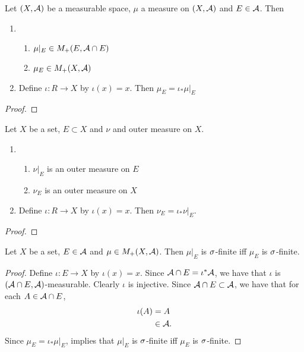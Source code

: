 \documentclass{book}
\begin{document}
	\begin{ex}  
		Let $(X, \mathcal{A})$ be a measurable space, $\mu$ a measure on $(X, \mathcal{A})$ and $E \in \mathcal{A}$. Then 
		\begin{enumerate}
			\item \begin{enumerate}
				\item $\mu|_E \in M_+(E, \mathcal{A} \cap E)$
				\item $\mu_E \in M_+(X, \mathcal{A})$
			\end{enumerate}
			\item Define $\iota:R \rightarrow X$ by $\iota(x) = x$. Then $\mu_E = \iota_*\mu|_E$
		\end{enumerate} 
	\end{ex}

	\begin{proof}
	\end{proof}

	\begin{ex}  
		Let $X$ be a set, $E \subset X$ and $\nu$ and outer measure on $X$. 
		\begin{enumerate}
			\item \begin{enumerate}
				\item $\nu|_E$ is an outer measure on $E$
				\item $\nu_E$ is an outer measure on $X$
			\end{enumerate}
			\item Define $\iota:R \rightarrow X$ by $\iota(x) = x$. Then $\nu_E = \iota_*\nu|_E$.
		\end{enumerate}
		
	\end{ex}

	\begin{proof}
	\end{proof}

	\begin{ex}  
		Let $X$ be a set, $E \in \mathcal{A}$ and $\mu \in M_+(X, \mathcal{A})$. Then $\mu|_E$ is $\sigma$-finite iff $\mu_E$ is $\sigma$-finite.
	\end{ex}

	\begin{proof} 
		Define $\iota:E \rightarrow X$ by $\iota(x) = x$. Since $\mathcal{A} \cap E = \iota^*\mathcal{A}$, we have that $\iota$ is $(\mathcal{A} \cap E, \mathcal{A})$-measurable. Clearly $\iota$ is injective. Since $\mathcal{A} \cap E \subset \mathcal{A}$, we have that for each $A \in \mathcal{A} \cap E$,  
		\begin{align*}
			\iota(A) 
			& = A \\
			& \in \mathcal{A}.
		\end{align*}
		Since $\mu_E = \iota_* \mu|_E$,  implies that $\mu|_E$ is $\sigma$-finite iff $\mu_E$ is $\sigma$-finite.
	\end{proof}
\end{document}
